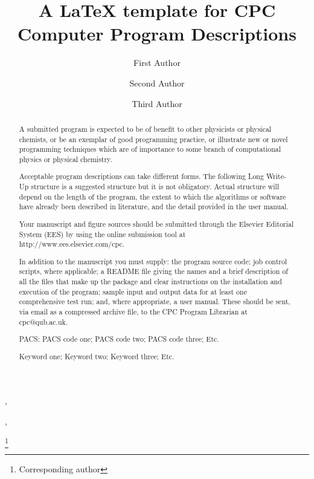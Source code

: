 \documentclass{elsart}
\begin{document}
\begin{frontmatter}

\title{A \LaTeX{} template for CPC Computer Program Descriptions}

\author[a]{First Author},
\author[a,b]{Second Author},
\author[b]{Third Author}

\thanks[author]{Corresponding author}

\address[a]{First Address}
\address[b]{Second Address}

\begin{abstract}
A submitted program is expected to be of benefit to other physicists or physical chemists, or be an exemplar of good programming practice, or illustrate new or novel programming techniques which are of importance to some branch of computational physics or physical chemistry.

Acceptable program descriptions can take different forms. The following Long Write-Up structure is a suggested structure but it is not obligatory. Actual structure will depend on the length of the program, the extent to which the algorithms or software have already been described in literature, and the detail provided in the user manual.

Your manuscript and figure sources should be submitted through the Elsevier Editorial System (EES) by using the online submission tool at \\ 
http://www.ees.elsevier.com/cpc.

In addition to the manuscript you must supply: the program source code; job control scripts, where applicable; a README file giving the names and a brief description of all the files that make up the package and clear instructions on the installation and execution of the program; sample input and output data for at least one comprehensive test run; and, where appropriate, a user manual. These should be sent, via email as a compressed archive file, to the CPC Program Librarian at cpc@qub.ac.uk.

\begin{flushleft}
PACS: PACS code one; PACS code two; PACS code three; Etc.
\end{flushleft}

\begin{keyword}
Keyword one; Keyword two; Keyword three; Etc.
\end{keyword}

\end{abstract}


\end{frontmatter}
\end{document}
